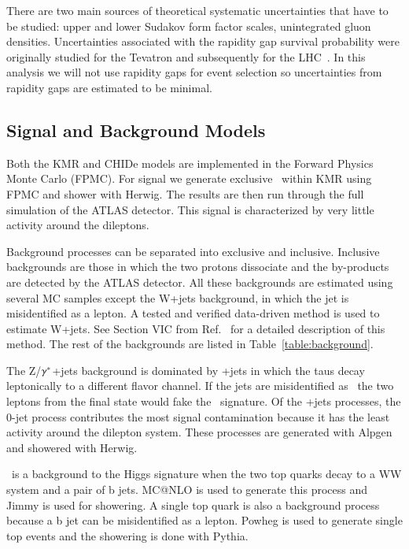 \par There are two main sources of theoretical systematic uncertainties
that have to be studied: upper and lower Sudakov form factor scales, unintegrated
gluon densities. Uncertainties associated with the 
rapidity gap survival probability were originally studied for the 
Tevatron and subsequently for the LHC~\cite{Khoze2000wk}. 
In this analysis we will not use rapidity gaps for event selection so 
uncertainties from rapidity gaps are estimated to be minimal. 

\subsection{Signal and Background Models}
\par Both the KMR and CHIDe models are implemented in the Forward Physics Monte Carlo (FPMC).
For signal we generate exclusive \hwwll\ within KMR using FPMC 
and shower with Herwig. The results are then run through the full simulation
of the ATLAS detector. This signal is characterized by very little activity 
around the dileptons. 
\par Background processes can be separated into exclusive and inclusive. 
Inclusive backgrounds are those in which the two protons dissociate and 
the by-products are detected by the ATLAS detector. All these backgrounds 
are estimated using several MC samples except the W+jets background, in 
which the jet is misidentified as a lepton. A 
tested and verified data-driven method is used to estimate W+jets. See 
Section VIC from Ref.~\cite{ATLASCONF2014060} for a detailed description 
of this method. The rest of the backgrounds are listed in Table~\ref{table:background}.

\par The Z/$\gamma^*$+jets background is dominated by \zGamtau+jets in 
which the taus decay leptonically to a different flavor
channel. If the jets are misidentified as \MET\ the two leptons from the final state 
would fake the \hwwll\ signature. Of the \zGamtau+jets processes, the 0-jet process
contributes the most signal contamination because it has the least activity
around the dilepton system. These processes are generated with Alpgen and showered with Herwig. 

\par \ttbar\ is a background to the Higgs signature when the two top quarks decay to a WW system
and a pair of b jets. MC@NLO is used to generate this process and Jimmy is used for showering. 
A single top quark is also a background process because a b jet can be misidentified 
as a lepton. Powheg is used to generate single top events and the showering is done 
with Pythia. 

